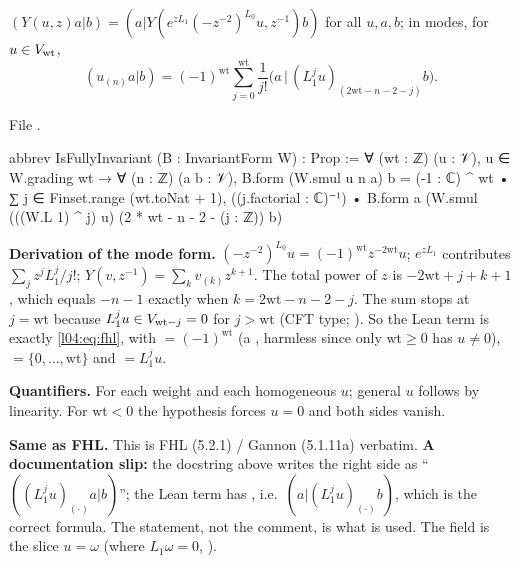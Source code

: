 \begin{definition}\label{l04:def:fullinv}
$(Y(u,z)a|b) = (a|Y(e^{zL_1}(-z^{-2})^{L_0}u,z^{-1})b)$ for all $u,a,b$; in modes, for $u\in V_{\mathrm{wt}}$,
\begin{equation}\label{l04:eq:fhl}
(u_{(n)}a|b) = (-1)^{\mathrm{wt}}\sum_{j=0}^{\mathrm{wt}}\frac1{j!}\big(a\,\big|\,(L_1^ju)_{(2\mathrm{wt}-n-2-j)}b\big).
\end{equation}
\end{definition}
\noindent File .
\begin{leancode}
abbrev IsFullyInvariant (B : InvariantForm W) : Prop :=
  ∀ (wt : ℤ) (u : 𝒱), u ∈ W.grading wt → ∀ (n : ℤ) (a b : 𝒱),
    B.form (W.smul u n a) b
      = (-1 : ℂ) ^ wt • ∑ j ∈ Finset.range (wt.toNat + 1), ((j.factorial : ℂ)⁻¹) •
          B.form a (W.smul (((W.L 1) ^ j) u) (2 * wt - n - 2 - (j : ℤ)) b)
\end{leancode}
\begin{dictionary}
\textbf{Derivation of the mode form.} $(-z^{-2})^{L_0}u = (-1)^{\mathrm{wt}}z^{-2\mathrm{wt}}u$;
$e^{zL_1}$ contributes $\sum_jz^jL_1^j/j!$; $Y(v,z^{-1}) = \sum_kv_{(k)}z^{k+1}$. The total power of $z$ is
$-2\mathrm{wt}+j+k+1$, which equals $-n-1$ exactly when $k = 2\mathrm{wt}-n-2-j$. The sum stops at
$j = \mathrm{wt}$ because $L_1^ju\in V_{\mathrm{wt}-j} = 0$ for $j>\mathrm{wt}$ (CFT type;
\allowbreak{}\allowbreak{}\allowbreak{}\allowbreak{}). So the Lean term is exactly \eqref{l04:eq:fhl}, with 
$= (-1)^{\mathrm{wt}}$ (a , harmless since only $\mathrm{wt}\ge0$ has $u\ne0$),
 $= \{0,\dots,\mathrm{wt}\}$ and  $= L_1^ju$.

\textbf{Quantifiers.} For each weight and each homogeneous $u$; general $u$ follows by linearity. For
$\mathrm{wt}<0$ the hypothesis forces $u = 0$ and both sides vanish.

\textbf{Same as FHL.} This is FHL (5.2.1) / Gannon (5.1.11a) verbatim. \textbf{A documentation slip:}
the docstring above  writes the right side as ``$((L_1^ju)_{(\cdot)}a|b)$''; the
Lean term has , i.e.\ $(a|(L_1^ju)_{(\cdot)}b)$, which is the correct formula.
The statement, not the comment, is what is used. The  field is the slice $u = \omega$
(where $L_1\omega = 0$, \allowbreak{}\allowbreak{}).
\end{dictionary}
